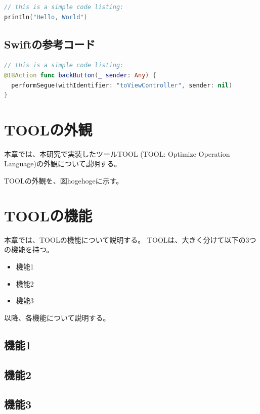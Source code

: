 \documentclass[uplatex, report, a4j, 10pt, dvipdfmx]{jsbook}
\newcommand{\tool}{TOOL}
\newcommand{\toolFullName}{TOOL: Optimize Operation Language}
\begin{document}
\begin{lstlisting}[caption={Kotlinの参考コード}, label={lst:example_kotlin}, language=Kotlin]
// this is a simple code listing:
println("Hello, World")
\end{lstlisting}

\section{Swiftの参考コード}

\begin{lstlisting}[caption={Swiftの参考コード}, label={lst:example_swift}, language=swift]
// this is a simple code listing:
@IBAction func backButton(_ sender: Any) {
  performSegue(withIdentifier: "toViewController", sender: nil)
}
\end{lstlisting}



\chapter{\tool{}の外観}\label{cha:Appearance}

本章では、本研究で実装したツール\tool{} (\toolFullName{})の外観について説明する。

\tool{}の外観を、図hogehogeに示す。


\chapter{\tool{}の機能}\label{cha:Function}

本章では、\tool{}の機能について説明する。
\tool{}は、大きく分けて以下の3つの機能を持つ。

\begin{itemize}
	\item 機能1
	\item 機能2
	\item 機能3
\end{itemize}

以降、各機能について説明する。



\section{機能1}

\section{機能2}
\section{機能3}
\end{document}
